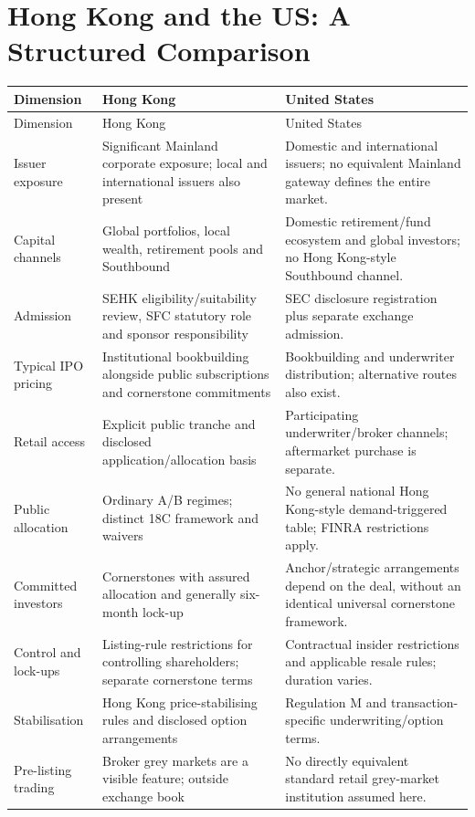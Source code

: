 \documentclass[11pt,a4paper]{article}
\begin{document}
\section{Hong Kong and the US: A Structured Comparison}
\begin{longtable}{@{}L{3.0cm}L{6.25cm}L{6.25cm}@{}}
\toprule Dimension & Hong Kong & United States\\\midrule\endfirsthead
\toprule Dimension & Hong Kong & United States\\\midrule\endhead
Issuer exposure & Significant Mainland corporate exposure; local and international issuers also present & Domestic and international issuers; no equivalent Mainland gateway defines the entire market.\\
Capital channels & Global portfolios, local wealth, retirement pools and Southbound & Domestic retirement/fund ecosystem and global investors; no Hong Kong-style Southbound channel.\\
Admission & SEHK eligibility/suitability review, SFC statutory role and sponsor responsibility & SEC disclosure registration plus separate exchange admission.\\
Typical IPO pricing & Institutional bookbuilding alongside public subscriptions and cornerstone commitments & Bookbuilding and underwriter distribution; alternative routes also exist.\\
Retail access & Explicit public tranche and disclosed application/allocation basis & Participating underwriter/broker channels; aftermarket purchase is separate.\\
Public allocation & Ordinary A/B regimes; distinct 18C framework and waivers & No general national Hong Kong-style demand-triggered table; FINRA restrictions apply.\\
Committed investors & Cornerstones with assured allocation and generally six-month lock-up & Anchor/strategic arrangements depend on the deal, without an identical universal cornerstone framework.\\
Control and lock-ups & Listing-rule restrictions for controlling shareholders; separate cornerstone terms & Contractual insider restrictions and applicable resale rules; duration varies.\\
Stabilisation & Hong Kong price-stabilising rules and disclosed option arrangements & Regulation M and transaction-specific underwriting/option terms.\\
Pre-listing trading & Broker grey markets are a visible feature; outside exchange book & No directly equivalent standard retail grey-market institution assumed here.\\

\end{longtable}
\end{document}
